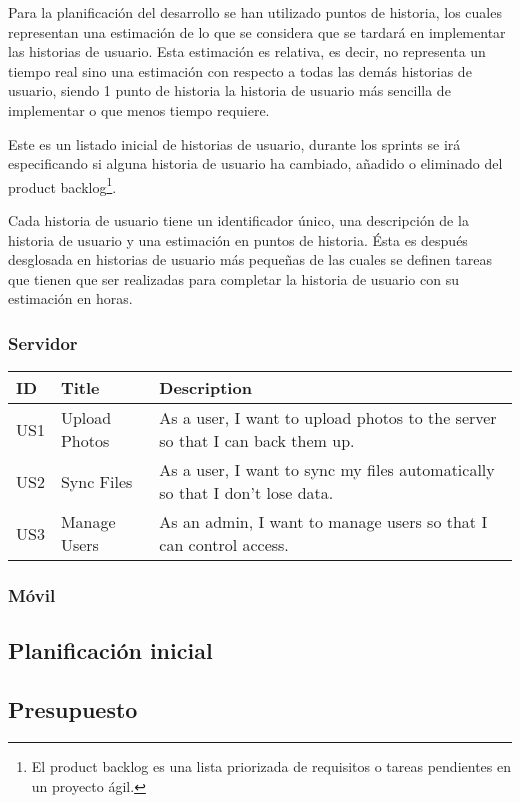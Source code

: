 Para la planificación del desarrollo se han utilizado puntos de historia, los cuales representan una estimación de lo que se considera que se tardará en implementar las historias de usuario. Esta estimación es relativa, es decir, no representa un tiempo real sino una estimación con respecto a todas las demás historias de usuario, siendo 1 punto de historia la historia de usuario más sencilla de implementar o que menos tiempo requiere.

Este es un listado inicial de historias de usuario, durante los sprints se irá especificando si alguna historia de usuario ha cambiado, añadido o eliminado del product backlog\footnote{El product backlog es una lista priorizada de requisitos o tareas pendientes en un proyecto ágil.}.

Cada historia de usuario tiene un identificador único, una descripción de la historia de usuario y una estimación en puntos de historia. Ésta es después desglosada en historias de usuario más pequeñas de las cuales se definen tareas que tienen que ser realizadas para completar la historia de usuario con su estimación en horas.

\subsubsection{Servidor}
\renewcommand{\arraystretch}{1.3} %

\begin{longtable}{|p{2cm}|p{4cm}|p{6cm}|}
    \hline
    \textbf{ID} & \textbf{Title} & \textbf{Description} \\ \hline
    US1 & Upload Photos & As a user, I want to upload photos to the server so that I can back them up. \\ \hline
    US2 & Sync Files & As a user, I want to sync my files automatically so that I don’t lose data. \\ \hline
    US3 & Manage Users & As an admin, I want to manage users so that I can control access. \\ \hline
\end{longtable}

\subsubsection{Móvil} 

\subsection{Planificación inicial}

\subsection{Presupuesto}

